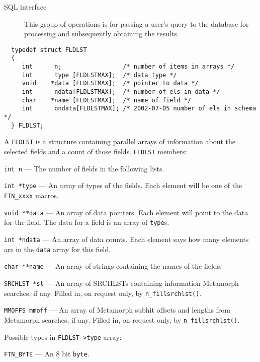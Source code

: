 \begin{description}
\item[SQL interface]

    This group of operations is for passing a user's query to the
    database for processing and subsequently obtaining the results.

\end{description}



\SYNOPSIS
\begin{verbatim}
  typedef struct FLDLST
  {
     int      n;                 /* number of items in arrays */
     int      type [FLDLSTMAX];  /* data type */
     void    *data [FLDLSTMAX];  /* pointer to data */
     int      ndata[FLDLSTMAX];  /* number of els in data */
     char    *name [FLDLSTMAX];  /* name of field */
     int      ondata[FLDLSTMAX]; /* 2002-07-05 number of els in schema */
  } FLDLST;
\end{verbatim}

A \verb`FLDLST` is a structure containing parallel arrays of information
about the selected fields and a count of those fields. \verb`FLDLST` members:

\verb`int n` --- The number of fields in the following lists.

\verb`int *type` --- An array of types of the fields.  Each element will
be one of the \verb`FTN_xxxx` macros.

\verb`void **data` --- An array of data pointers.  Each element will
point to the data for the field. The data for a field is an
array of \verb`type`s.

\verb`int *ndata` ---  An array of data counts. Each element says how
many elements are in the \verb`data` array for this field.

\verb`char **name` --- An array of strings containing the names of the
fields.

\verb`SRCHLST *sl` --- An array of SRCHLSTs containing information
Metamorph searches, if any. Filled in, on request only,
by \verb`n_fillsrchlst()`.

\verb`MMOFFS mmoff` --- An array of Metamorph subhit offsets and lengths
from Metamorph searches, if any. Filled in, on request only,
by \verb`n_fillsrchlst()`.

Possible types in \verb`FLDLST->type` array:

\verb`FTN_BYTE` --- An 8 bit \verb`byte`.


